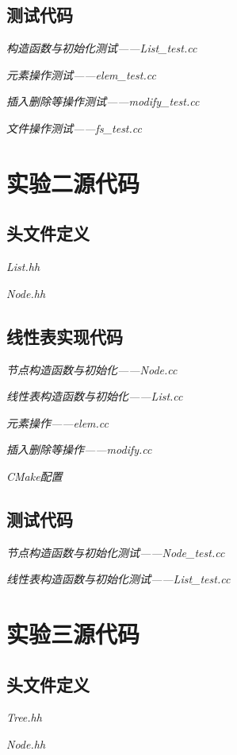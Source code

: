 \documentclass[format=draft,language=chinese,category=academic-report]{hustreport}
\begin{document}
\subsection{测试代码}\label{appendix:test1}
\emph{构造函数与初始化测试——List\_test.cc}

\emph{元素操作测试——elem\_test.cc}

\emph{插入删除等操作测试——modify\_test.cc}

\emph{文件操作测试——fs\_test.cc}


\section{实验二源代码}\label{appendix:lab2}
\subsection{头文件定义}\label{appendix:h2}
\emph{List.hh}

\emph{Node.hh}

\subsection{线性表实现代码}
\emph{节点构造函数与初始化——Node.cc}

\emph{线性表构造函数与初始化——List.cc}

\emph{元素操作——elem.cc}

\emph{插入删除等操作——modify.cc}

\emph{CMake配置}

\subsection{测试代码}\label{appendix:test2}
\emph{节点构造函数与初始化测试——Node\_test.cc}

\emph{线性表构造函数与初始化测试——List\_test.cc}


\section{实验三源代码}\label{appendix:lab3}
\subsection{头文件定义}\label{appendix:h3}
\emph{Tree.hh}

\emph{Node.hh}

\end{document}
